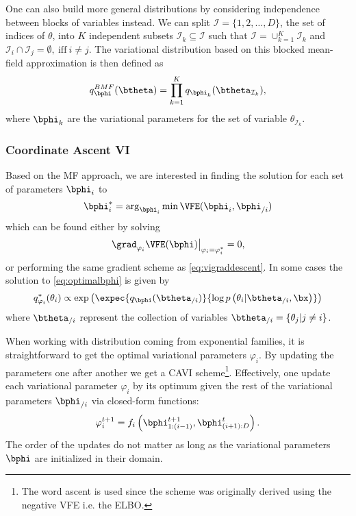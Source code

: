 One can also build more general distributions by considering independence between blocks of variables instead.
We can split $\mathcal{I}=\{1,2,\ldots,D\}$, the set of indices of $\theta$, into $K$ independent subsets $\mathcal{I}_k \subseteq \mathcal{I}$ such that  $\mathcal{I} = \cup_{k=1}^K \mathcal{I}_{k}$ and $\mathcal{I}_i \cap \mathcal{I}_j=\emptyset,~\mathrm{iff}~i \neq j$.
The variational distribution based on this blocked mean-field approximation is then defined as
\begin{align}
    q^{BMF}_{\bphi}(\btheta) = \prod_{k=1}^K q_{\bphi_k}(\btheta_{\mathcal{I}_k}),
\end{align}
where $\bphi_k$ are the variational parameters for the set of variable $\theta_{\mathcal{I}_k}$.
\subsubsection{Coordinate Ascent VI}

Based on the \ac{MF} approach, we are interested in finding the solution for each set of parameters $\bphi_i$ to
\begin{align}
    \bphi_i^* = \arg_{\bphi_i}\min \VFE(\bphi_i, \bphi_{/i})
    \label{eq:optimalbphi}
\end{align}
which can be found either by solving
\begin{align}
\left.\grad_{\varphi_i}\VFE(\bphi)\right\vert_{\varphi_i=\varphi_i^*} = 0,
\end{align}
or performing the same gradient scheme as \eqref{eq:vigraddescent}.
In some cases the solution to \eqref{eq:optimalbphi} is given by
\begin{align}
q_{\varphi_i}^*(\theta_i) \propto \exp\left(\expec{q_{\bphi}(\btheta_{/i})}{\log p\left(\theta_i|\btheta_{/i},\bx\right)}\right)
\end{align}
where $\btheta_{/i}$ represent the collection of variables $\btheta_{/i} = \{\theta_j | j \neq i\}$.

When working with distribution coming from exponential families, it is straightforward to get the optimal variational parameters $\varphi_i$.
By updating the parameters one after another we get a \ac{CAVI} scheme\footnote{The word ascent is used since the scheme was originally derived using the negative \ac{VFE} i.e. the \ac{ELBO}.}.
Effectively, one update each variational parameter $\varphi_i$ by its optimum given the rest of the variational parameters $\bphi_{/i}$ via closed-form functions:
\begin{align}
\varphi_i^{t+1} = f_i\left(\bphi_{1:(i-1)}^{t+1}, \bphi_{(i+1):D}^t\right).
\end{align}
The order of the updates do not matter as long as the variational parameters $\bphi$ are initialized in their domain.

